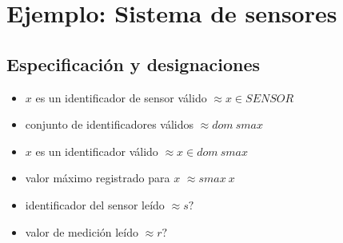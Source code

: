 \section*{Ejemplo: Sistema de sensores}

\subsection*{Especificación y designaciones}

\begin{zed}
[SENSOR]
\end{zed}

\begin{itemize}
  \item $x$ es un identificador de sensor válido $\approx x \in SENSOR$
\end{itemize}


\begin{itemize}
  \item conjunto de identificadores válidos $\approx dom~smax$ \\
  \item $x$ es un identificador válido $\approx x \in dom~smax$ \\
  \item valor máximo registrado para $x$ $\approx smax~x$ \\
\end{itemize}


\begin{itemize}
  \item identificador del sensor leído $\approx s?$ \\
  \item valor de medición leído $\approx r?$ \\
\end{itemize}


